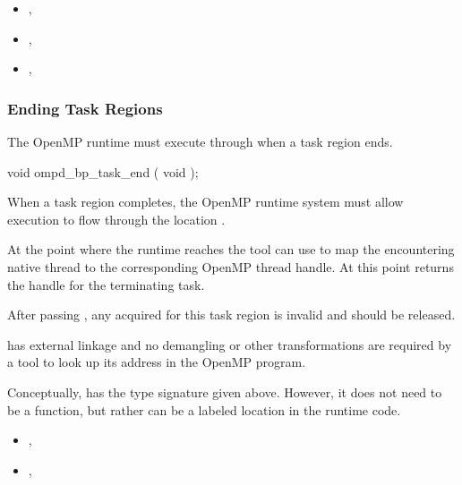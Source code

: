 \crossreferences
\begin{itemize}
\item
  , 
\item
  , 
\item
  , 
\end{itemize}

\subsubsection{Ending Task Regions}
\label{subsubsec:ompd_bp_task_end}

\summary
The OpenMP runtime must execute through 
when a task region ends.


\begin{cspecific}
\begin{ompSyntax}
void ompd_bp_task_end ( void );
\end{ompSyntax}
\end{cspecific}


\descr

When a task region completes, the OpenMP runtime system
must allow execution to flow through the location .

At the point where the runtime reaches 
the tool can use
to map the encountering native thread to the corresponding
OpenMP thread handle.
At this point 
returns the handle for the terminating task.

After passing , any  acquired for this
task region is invalid and should be released.

\restrictions

 has external  linkage and no
demangling or other transformations are required by a tool
to look up its address in the OpenMP program.

Conceptually,  has the type signature
given above.
However, it does not need to be a function, but rather can be a labeled location
in the runtime code.

\crossreferences
\begin{itemize}
\item
  , 
\item
  , 
\end{itemize}

